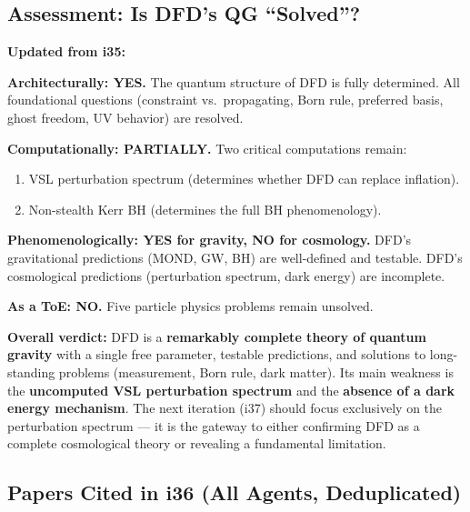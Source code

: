 \documentclass[11pt,a4paper]{article}
\begin{document}
\subsection{Assessment: Is DFD's QG ``Solved''?}

\textbf{Updated from i35:}

\textbf{Architecturally: YES.} The quantum structure of DFD is fully determined. All foundational questions (constraint vs.\ propagating, Born rule, preferred basis, ghost freedom, UV behavior) are resolved.

\textbf{Computationally: PARTIALLY.} Two critical computations remain:
\begin{enumerate}
\item VSL perturbation spectrum (determines whether DFD can replace inflation).
\item Non-stealth Kerr BH (determines the full BH phenomenology).
\end{enumerate}

\textbf{Phenomenologically: YES for gravity, NO for cosmology.} DFD's gravitational predictions (MOND, GW, BH) are well-defined and testable. DFD's cosmological predictions (perturbation spectrum, dark energy) are incomplete.

\textbf{As a ToE: NO.} Five particle physics problems remain unsolved.

\textbf{Overall verdict:} DFD is a \textbf{remarkably complete theory of quantum gravity} with a single free parameter, testable predictions, and solutions to long-standing problems (measurement, Born rule, dark matter). Its main weakness is the \textbf{uncomputed VSL perturbation spectrum} and the \textbf{absence of a dark energy mechanism}. The next iteration (i37) should focus exclusively on the perturbation spectrum --- it is the gateway to either confirming DFD as a complete cosmological theory or revealing a fundamental limitation.

\subsection{Papers Cited in i36 (All Agents, Deduplicated)}
\end{document}
